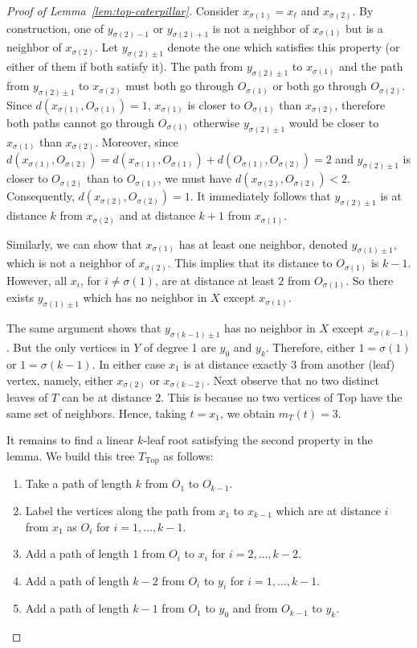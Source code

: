 \documentclass[11pt,letter]{article}
\theoremstyle{remark}
\newcommand{\T}{\text{Top}}
\begin{document}
\begin{proof}[Proof of Lemma~\ref{lem:top-caterpillar}]
    Consider $x_{\sigma(1)} = x_{\ell}$ and $x_{\sigma(2)}$. By construction, one of $y_{\sigma(2)-1}$ or $y_{\sigma(2)+1}$ is not a neighbor of $x_{\sigma(1)}$ but is a neighbor of $x_{\sigma(2)}$. Let $y_{\sigma(2)\pm 1}$ denote the one which satisfies this property (or either of them if both satisfy it). 
    The path from $y_{\sigma(2)\pm 1}$ to $x_{\sigma(1)}$ and the path from $y_{\sigma(2)\pm 1}$ to $x_{\sigma(2)}$ must both go through $O_{\sigma(1)}$ or both go through $O_{\sigma(2)}$. Since $d(x_{\sigma(1)},O_{\sigma(1)})=1$, $x_{\sigma(1)}$ is closer to $O_{\sigma(1)}$ than $x_{\sigma(2)}$, therefore both paths cannot go through $O_{\sigma(1)}$ otherwise $y_{\sigma(2)\pm 1}$ would be closer to $x_{\sigma(1)}$
    than $x_{\sigma(2)}$. Moreover, since $d(x_{\sigma(1)},O_{\sigma(2)})=d(x_{\sigma(1)},O_{\sigma(1)})+d(O_{\sigma(1)}, O_{\sigma(2)}) = 2$ and $y_{\sigma(2)\pm 1}$ is  closer to $O_{\sigma(2)}$ than to $O_{\sigma(1)}$, we must have $d(x_{\sigma(2)},O_{\sigma(2)})<2$. Consequently, $d(x_{\sigma(2)},O_{\sigma(2)})= 1$.
    It immediately follows that $y_{\sigma(2)\pm 1}$ is at distance $k$ from $x_{\sigma(2)}$ and at distance $k+1$ from $x_{\sigma(1)}$. 
    
    Similarly, we can show that $x_{\sigma(1)}$ has at least one neighbor, denoted $y_{\sigma(1)\pm 1}$, which is not a neighbor of $x_{\sigma(2)}$. This implies that its distance to $O_{\sigma(1)}$ is $k-1$. However, all $x_i$, for $i\neq \sigma(1)$, are at distance at least $2$ from $O_{\sigma(1)}$. So there exists $y_{\sigma(1)\pm 1}$ which has no neighbor in $X$ except $x_{\sigma(1)}$. 

    The same argument shows that $y_{\sigma(k-1)\pm 1}$ has no neighbor in $X$ except $x_{\sigma(k-1)}$.
    But the only vertices in $Y$ of degree 1 are $y_0$ and $y_{k}$. Therefore, either $1=\sigma(1)$ or $1=\sigma(k-1)$. In either case $x_1$ is at distance exactly $3$ from another (leaf) vertex, namely, either $x_{\sigma(2)}$ or $x_{\sigma(k-2)}$.  Next observe that no two distinct leaves of $T$ can be at distance $2$. This is because  no two vertices of $\T$ have the same set of neighbors. Hence, taking $t=x_1$, we obtain $m_T(t)=3$.

    It remains to find a linear $k$-leaf root satisfying the second property in the lemma. 
    We build this tree $T_{\T}$ as follows:
    \begin{enumerate}
        \item Take a path of length $k$ from $O_1$ to $O_{k-1}$.
        \item Label the vertices along the path from $x_1$ to $x_{k-1}$ which are at distance $i$ from $x_1$ as $O_i$ for $i=1,\dots,k-1$.
        \item Add a path of length $1$ from $O_i$ to $x_i$ for $i=2,\dots,k-2$.
        \item Add a path of length $k-2$ from $O_i$ to $y_i$ for $i=1,\dots,k-1$.
        \item Add a path of length $k-1$ from $O_1$ to $y_0$ and from $O_{k-1}$ to $y_k$.
    \end{enumerate}



\end{proof}
\end{document}
